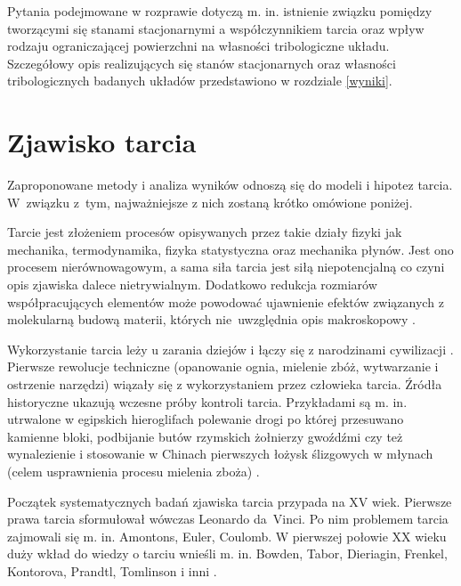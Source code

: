 \documentclass[12pt,a4paper,openright]{report} %
\begin{document}
Pytania podejmowane w rozprawie dotyczą m. in. istnienie związku pomiędzy tworzącymi się stanami stacjonarnymi a współczynnikiem tarcia oraz wpływ rodzaju ograniczającej powierzchni na własności tribologiczne układu. Szczegółowy opis realizujących się stanów stacjonarnych oraz własności tribologicznych badanych układów przedstawiono w rozdziale \ref{wyniki}.
%
%
\chapter{Zjawisko tarcia}
%
Zaproponowane metody i analiza wyników odnoszą się do modeli i hipotez tarcia. W~związku z~tym, najważniejsze z nich zostaną krótko omówione poniżej.

Tarcie jest złożeniem procesów opisywanych przez takie działy fizyki jak mechanika, termodynamika, fizyka statystyczna oraz mechanika płynów. Jest ono procesem nierównowagowym, a sama siła tarcia jest siłą niepotencjalną co czyni opis zjawiska dalece nietrywialnym. Dodatkowo redukcja rozmiarów współpracujących elementów może powodować ujawnienie efektów związanych z molekularną budową materii, których nie~uwzględnia opis makroskopowy \cite{DMH1}.
%
%
%

Wykorzystanie tarcia leży u zarania dziejów i łączy się z narodzinami cywilizacji \cite{Dieriagin}. Pierwsze rewolucje techniczne (opanowanie ognia, mielenie zbóż, wytwarzanie i ostrzenie narzędzi) wiązały się z wykorzystaniem przez człowieka tarcia. Źródła historyczne ukazują wczesne próby kontroli tarcia. Przykładami są m. in. utrwalone w egipskich hieroglifach polewanie drogi po której przesuwano kamienne bloki, podbijanie butów  rzymskich żołnierzy gwoźdźmi czy też wynalezienie i stosowanie w Chinach  pierwszych łożysk ślizgowych w młynach (celem usprawnienia procesu mielenia zboża) \cite{Hebda}.
%
%
%

Początek systematycznych badań zjawiska tarcia przypada na XV wiek. Pierwsze prawa tarcia sformułował wówczas Leonardo da~Vinci. Po nim problemem tarcia zajmowali się m. in. Amontons, Euler, Coulomb. W pierwszej połowie XX wieku duży wkład do wiedzy o tarciu wnieśli m. in. Bowden, Tabor, Dieriagin, Frenkel, Kontorova, Prandtl, Tomlinson i inni \cite{Borys}.
%
%
%
\end{document}
